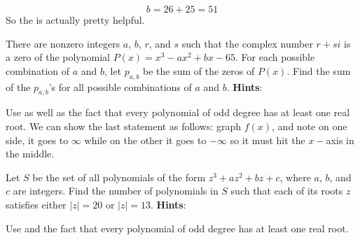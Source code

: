 \documentclass[11pt,titlepage]{scrartcl}
\newenvironment{hint}{\footnotesize \normalfont \textbf{Hints}:}{\hspace{-0.5ex}}
\begin{document}
\[b=26+25=\boxed{51}\]
So the  is actually pretty helpful.
\begin{exercisebox}
\begin{exercise}
There are nonzero integers $a$, $b$, $r$, and $s$ such that the complex number $r+si$ is a zero of the polynomial $P(x)={x}^{3}-a{x}^{2}+bx-65$. For each possible combination of $a$ and $b$, let ${p}_{a,b}$ be the sum of the zeros of $P(x)$. Find the sum of the ${p}_{a,b}$'s for all possible combinations of $a$ and $b$.
\begin{hint}
\begin{addhint}{
Use  as well as the fact that every polynomial of odd degree has at least one real root. We can show the last statement as follows: graph $f(x)$, and note on one side, it goes to $\infty$ while on the other it goes to $-\infty$ so it must hit the $x-$axis in the middle.
}\end{addhint}
\end{hint}
\end{exercise}
\begin{exercise}
Let $S$ be the set of all polynomials of the form $z^3 + az^2 + bz + c$, where $a$, $b$, and $c$ are integers. Find the number of polynomials in $S$ such that each of its roots $z$ satisfies either $|z| = 20$ or $|z| = 13$.
\begin{hint}
\begin{addhint}{
Use  and the fact that every polynomial of odd degree has at least one real root.
}\end{addhint}
\end{hint}
\end{exercise}
\end{exercisebox}
\end{document}
